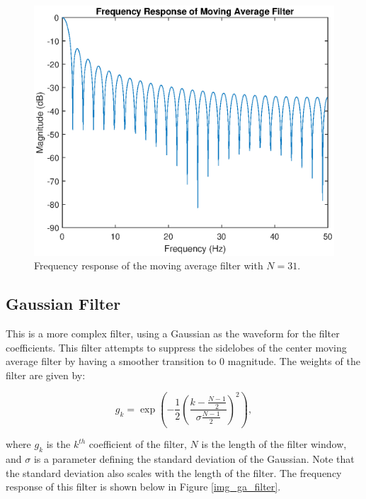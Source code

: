                 \begin{figure}[!th]
                    \includegraphics[width=\textwidth]{Images/cm_filter.eps}
                    \centering
                    \caption{Frequency response of the moving average filter with $N=31$.}
                    \label{img_cm_filter}
                \end{figure}

            \subsection{Gaussian Filter}

                This is a more complex filter, using a Gaussian as the waveform for the filter coefficients. This filter attempts to suppress the sidelobes of the center moving average filter by having a smoother transition to 0 magnitude. The weights of the filter are given by:

                \begin{equation}
                    g_k = \exp(-\frac{1}{2}(\frac{k - \frac{N-1}{2}}{\sigma \frac{N-1}{2}})^2),
                \end{equation}

                where $g_k$ is the $k^{th}$ coefficient of the filter, $N$ is the length of the filter window, and $\sigma$ is a parameter defining the standard deviation of the Gaussian. Note that the standard deviation also scales with the length of the filter. The frequency response of this filter is shown below in Figure \ref{img_ga_filter}.

